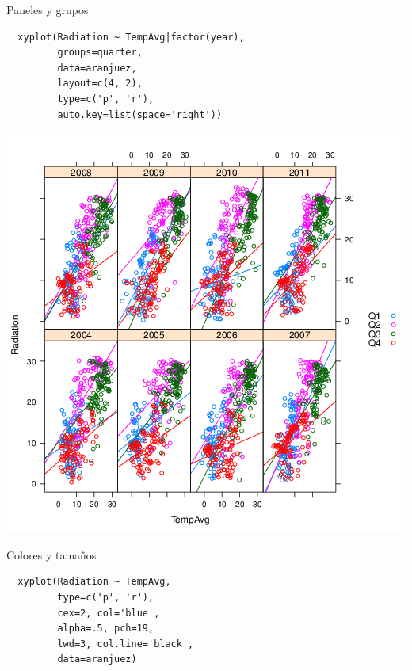 \documentclass[xcolor={usenames,svgnames,dvipsnames}]{beamer}
\begin{document}
\begin{frame}[fragile,label={sec:orgheadline23}]{Paneles y grupos}
 \lstset{language=R,label= ,caption= ,captionpos=b,numbers=none}
\begin{lstlisting}
  xyplot(Radiation ~ TempAvg|factor(year),
         groups=quarter,
         data=aranjuez,
         layout=c(4, 2),
         type=c('p', 'r'),
         auto.key=list(space='right'))
\end{lstlisting}
\end{frame}

\begin{frame}[label={sec:orgheadline24}]{}
\includegraphics[width=.9\linewidth]{figs/xyplotQuarterYearSmooth.png}
\end{frame}

\begin{frame}[fragile,label={sec:orgheadline25}]{Colores y tamaños}
 \lstset{language=R,label= ,caption= ,captionpos=b,numbers=none}
\begin{lstlisting}
  xyplot(Radiation ~ TempAvg,
         type=c('p', 'r'),
         cex=2, col='blue',
         alpha=.5, pch=19,
         lwd=3, col.line='black',
         data=aranjuez)
\end{lstlisting}
\end{frame}
\end{document}
